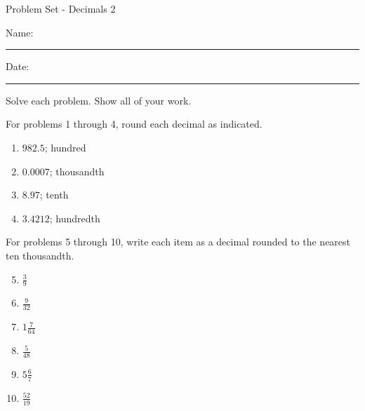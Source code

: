 \documentclass[12pt]{article}
\begin{document}
\pagestyle{empty} %
\begin{center}
          Problem Set - Decimals 2 \\[0.5in]
\end{center}
Name: \rule{4in}{0.005in} Date: \rule{1.5in}{0.005in} 
  \vspace{0.25in}

Solve each problem. Show all of your work. 

For problems 1 through 4, round each decimal as indicated. 
\begin{multicols}{2}
\begin{enumerate}

    \item \hspace{0.250in} $982.5$; hundred
  \vspace{0.25in}

    \item \hspace{0.250in} $0.0007$; thousandth
  \vspace{0.25in}

    \item \hspace{0.250in} $8.97$; tenth
  \vspace{0.25in}

    \item \hspace{0.250in} $3.4212$; hundredth
  \vspace{0.25in}

\end{enumerate}
\end{multicols}
For problems 5 through 10, write each item as a decimal rounded to the nearest ten thousandth.
\begin{multicols}{2}
\begin{enumerate}
\setcounter{enumi}{4}

\item \hspace{0.25in} $\frac{3}{9}$ 
  \vspace{0.25in}
  
\item \hspace{0.25in} $\frac{9}{32}$ 
  \vspace{0.25in}

\item \hspace{0.25in} $1\frac{7}{64}$ 
  \vspace{0.25in}

\item \hspace{0.25in} $\frac{5}{48}$ 
  \vspace{0.25in}

\item \hspace{0.25in} $5\frac{6}{7}$ 
  \vspace{0.25in}

\item \hspace{0.25in} $\frac{52}{19}$ 
  \vspace{0.25in}
  
\end{enumerate}
\end{multicols}
\end{document}
